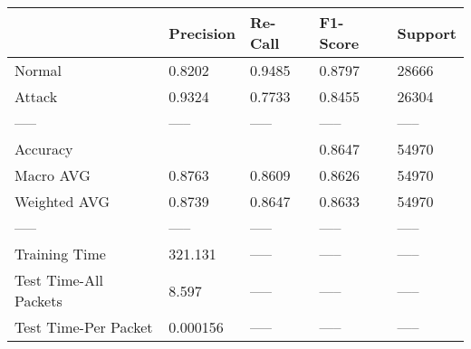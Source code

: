 \begin{tabular}{lllll}
\toprule
{} & Precision & Re-Call & F1-Score & Support \\
\midrule
Normal                &    0.8202 &  0.9485 &   0.8797 &   28666 \\
Attack                &    0.9324 &  0.7733 &   0.8455 &   26304 \\
-----                 &     ----- &   ----- &    ----- &   ----- \\
Accuracy              &           &         &   0.8647 &   54970 \\
Macro AVG             &    0.8763 &  0.8609 &   0.8626 &   54970 \\
Weighted AVG          &    0.8739 &  0.8647 &   0.8633 &   54970 \\
-----                 &     ----- &   ----- &    ----- &   ----- \\
Training Time         &   321.131 &   ----- &    ----- &   ----- \\
Test Time-All Packets &     8.597 &   ----- &    ----- &   ----- \\
Test Time-Per Packet  &  0.000156 &   ----- &    ----- &   ----- \\
\bottomrule
\end{tabular}
